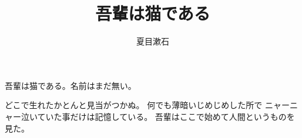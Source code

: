 \documentclass[uplatex]{jsarticle}
\title{吾輩は猫である}
\author{夏目漱石}
\date{}
\begin{document}
\maketitle

吾輩は猫である。名前はまだ無い。

どこで生れたかとんと見当がつかぬ。
何でも薄暗いじめじめした所で
ニャーニャー泣いていた事だけは記憶している。
吾輩はここで始めて人間というものを見た。
\end{document}
